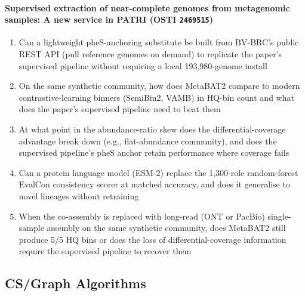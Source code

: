 \paragraph{Supervised extraction of near-complete genomes from metagenomic samples: A new service in PATRI \textnormal{\small(OSTI \texttt{2469515})}}
\begin{enumerate}[leftmargin=1.6em,itemsep=0.2em,topsep=0.2em,label=Q\arabic*.]
\item Can a lightweight pheS-anchoring substitute be built from BV-BRC's public REST API (pull reference genomes on demand) to replicate the paper's supervised pipeline without requiring a local 193,980-genome install
\item On the same synthetic community, how does MetaBAT2 compare to modern contrastive-learning binners (SemiBin2, VAMB) in HQ-bin count and what does the paper's supervised pipeline need to beat them
\item At what point in the abundance-ratio skew does the differential-coverage advantage break down (e.g., flat-abundance community), and does the supervised pipeline's pheS anchor retain performance where coverage fails
\item Can a protein language model (ESM-2) replace the 1,300-role random-forest EvalCon consistency scorer at matched accuracy, and does it generalise to novel lineages without retraining
\item When the co-assembly is replaced with long-read (ONT or PacBio) single-sample assembly on the same synthetic community, does MetaBAT2 still produce 5/5 HQ bins or does the loss of differential-coverage information require the supervised pipeline to recover them
\end{enumerate}
\subsection*{CS/Graph Algorithms}
